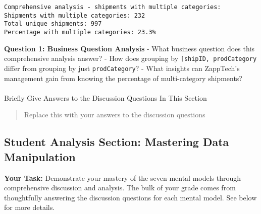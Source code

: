 \documentclass[
  letterpaper,
  DIV=11,
  numbers=noendperiod]{scrartcl}
\makeatletter
\let\oldparagraph\paragraph
\renewcommand{\paragraph}{
    \@ifstar
      \xxxParagraphStar
      \xxxParagraphNoStar
  }
\newcommand{\xxxParagraphStar}[1]{\oldparagraph*{#1}\mbox{}}
\newcommand{\xxxParagraphNoStar}[1]{\oldparagraph{#1}\mbox{}}
\makeatother
\begin{document}
\begin{verbatim}
Comprehensive analysis - shipments with multiple categories:
Shipments with multiple categories: 232
Total unique shipments: 997
Percentage with multiple categories: 23.3%
\end{verbatim}

\begin{tcolorbox}[enhanced jigsaw, colframe=quarto-callout-important-color-frame, title=\textcolor{quarto-callout-important-color}{\faExclamation}\hspace{0.5em}{🤔 Discussion Questions: Answering A Business Question}, breakable, opacityback=0, arc=.35mm, leftrule=.75mm, titlerule=0mm, left=2mm, toptitle=1mm, rightrule=.15mm, bottomtitle=1mm, bottomrule=.15mm, opacitybacktitle=0.6, toprule=.15mm, colback=white, coltitle=black, colbacktitle=quarto-callout-important-color!10!white]

\textbf{Question 1: Business Question Analysis} - What business question
does this comprehensive analysis answer? - How does grouping by
\texttt{{[}\textquotesingle{}shipID\textquotesingle{},\ \textquotesingle{}prodCategory\textquotesingle{}{]}}
differ from grouping by just
\texttt{\textquotesingle{}prodCategory\textquotesingle{}}? - What
insights can ZappTech's management gain from knowing the percentage of
multi-category shipments?

\end{tcolorbox}

\paragraph{Briefly Give Answers to the Discussion Questions In This
Section}\label{briefly-give-answers-to-the-discussion-questions-in-this-section-7}

\begin{quote}
Replace this with your answers to the discussion questions
\end{quote}

\subsection{Student Analysis Section: Mastering Data
Manipulation}\label{student-analysis-section}

\textbf{Your Task:} Demonstrate your mastery of the seven mental models
through comprehensive discussion and analysis. The bulk of your grade
comes from thoughtfully answering the discussion questions for each
mental model. See below for more details.
\end{document}

